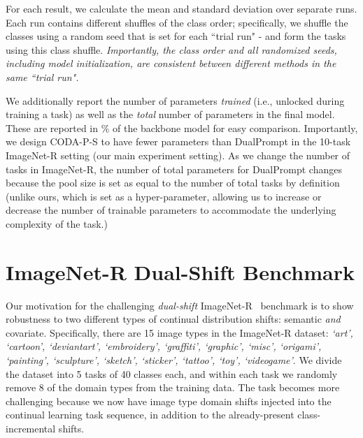 For each result, we calculate the mean and standard deviation over separate runs. Each run contains different shuffles of the class order; specifically, we shuffle the classes using a random seed that is set for each ``trial run" - and form the tasks using this class shuffle. \emph{Importantly, the class order and all randomized seeds, including model initialization, are consistent between different methods in the same ``trial run".}

We additionally report the number of parameters \emph{trained} (i.e., unlocked during training a task) as well as the \emph{total} number of parameters in the final model. These are reported in \% of the backbone model for easy comparison. Importantly, we design CODA-P-S to have fewer parameters than DualPrompt in the 10-task ImageNet-R setting (our main experiment setting). As we change the number of tasks in ImageNet-R, the number of total parameters for DualPrompt changes because the pool size is set as equal to the number of total tasks by definition (unlike ours, which is set as a hyper-parameter, allowing us to increase or decrease the number of trainable parameters to accommodate the underlying complexity of the task.)

\section{ImageNet-R Dual-Shift Benchmark}
\label{appendix-benchmark}

Our motivation for the challenging \emph{dual-shift} ImageNet-R~\cite{hendrycks2021many,wang2022dualprompt} benchmark is to show robustness to two different types of continual distribution shifts: semantic \emph{and} covariate. Specifically, there are 15 image types in the ImageNet-R dataset: \emph{`art', `cartoon', `deviantart', `embroidery', `graffiti', `graphic', `misc', `origami', `painting', `sculpture', `sketch', `sticker', `tattoo', `toy', `videogame'}. We divide the dataset into 5 tasks of 40 classes each, and within each task we randomly remove 8 of the domain types from the training data. The task becomes more challenging because we now have image type domain shifts injected into the continual learning task sequence, in addition to the already-present class-incremental shifts.
